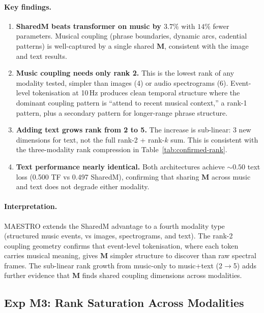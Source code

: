 \documentclass[11pt, a4paper]{article}
\newcommand{\M}{\mathbf{M}}
\theoremstyle{plain}
\theoremstyle{remark}
\begin{document}
\paragraph{Key findings.}
\begin{enumerate}[nosep]
    \item \textbf{SharedM beats transformer on music by $3.7\%$} with $14\%$ fewer parameters.  Musical coupling (phrase boundaries, dynamic arcs, cadential patterns) is well-captured by a single shared $\M$, consistent with the image and text results.

    \item \textbf{Music coupling needs only rank 2.}  This is the lowest rank of any modality tested, simpler than images (4) or audio spectrograms (6).  Event-level tokenisation at 10\,Hz produces clean temporal structure where the dominant coupling pattern is ``attend to recent musical context,'' a rank-1 pattern, plus a secondary pattern for longer-range phrase structure.

    \item \textbf{Adding text grows rank from 2 to 5.}  The increase is sub-linear: 3 new dimensions for text, not the full rank-2 + rank-$k$ sum.  This is consistent with the three-modality rank compression in Table~\ref{tab:confirmed-rank}.

    \item \textbf{Text performance nearly identical.}  Both architectures achieve ${\sim}0.50$ text loss (0.500 TF vs 0.497 SharedM), confirming that sharing $\M$ across music and text does not degrade either modality.
\end{enumerate}

\paragraph{Interpretation.}
MAESTRO extends the SharedM advantage to a fourth modality type (structured music events, vs images, spectrograms, and text).  The rank-2 coupling geometry confirms that event-level tokenisation, where each token carries musical meaning, gives $\M$ simpler structure to discover than raw spectral frames.  The sub-linear rank growth from music-only to music+text (2$\to$5) adds further evidence that $\M$ finds shared coupling dimensions across modalities.

\subsection{Exp M3: Rank Saturation Across Modalities}
\end{document}
